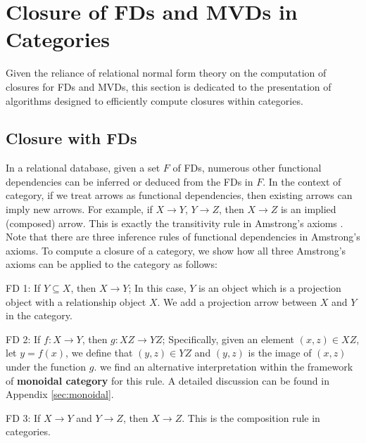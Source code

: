 

\section{Closure of FDs and MVDs in Categories}


Given the reliance of relational normal form theory on the computation of closures for FDs and MVDs, this section is dedicated to the  presentation of algorithms designed to efficiently compute closures within categories. 


\subsection{Closure with FDs}
\label{sec:ClosureFD}

In a relational database, given a set $F$ of FDs, numerous other functional dependencies can be inferred or deduced from the FDs in $F$. In the context of category, if we treat arrows as functional dependencies, then existing arrows can imply new arrows. For example, if $X \to Y$, $Y \to Z$, then $X \to Z$ is an implied (composed) arrow. This is exactly the transitivity rule in Amstrong's axioms \cite{armstrong1974dependency}.  Note that there are three inference rules of functional dependencies in Amstrong's axioms. To compute a closure of a category,  we show how all three Amstrong's axioms can be applied to the category as follows:

\noindent FD 1: If $Y \subseteq X$, then $X \to Y$; 
In this case, $Y$ is an object which is a projection object with a relationship object $X$. We add
 a projection arrow between $X$ and $Y$ in the category.

\noindent FD 2: If $f: X \to Y$, then $g: XZ \to YZ$;  Specifically, given an element $(x,z) \in XZ$, let $y = f(x)$, we define that $(y,z) \in YZ$ and $(y,z)$ is the image of $(x,z)$ under the function $g$. we find an alternative interpretation within the framework of \textbf{monoidal category} for this rule.  A detailed discussion can be found in Appendix \ref{sec:monoidal}. 

\noindent FD 3: If $X \to Y$ and $Y \to Z$, then $X \to Z$. This is the composition rule in categories.



